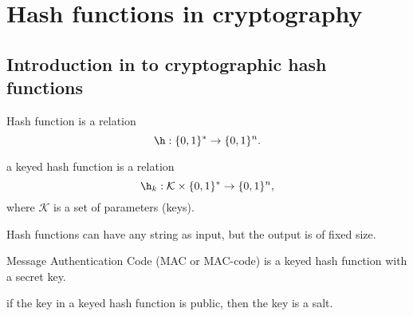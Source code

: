 \chapter{Hash functions in cryptography}

\section{Introduction in to cryptographic hash functions}

\begin{definition}
    Hash function is a relation
    $$\h: \{0, 1\}^{*} \rightarrow \{0, 1\}^{n}.$$
\end{definition}

\begin{definition}
    a keyed hash function is a relation
    $$\h_k: \mathcal{K} \times \{0, 1\}^{*} \rightarrow \{0, 1\}^{n},$$
    where $\mathcal{K}$ is a set of parameters (keys).
\end{definition}


\begin{remark}
    Hash functions can have any string as input, but the output is of fixed size.
\end{remark}

\begin{definition}
    Message Authentication Code (MAC or MAC-code) is a keyed hash function
    with a secret key.
\end{definition}

\begin{definition}[Salt]
    if the key in a keyed hash function is public, then the key is a salt.
\end{definition}

